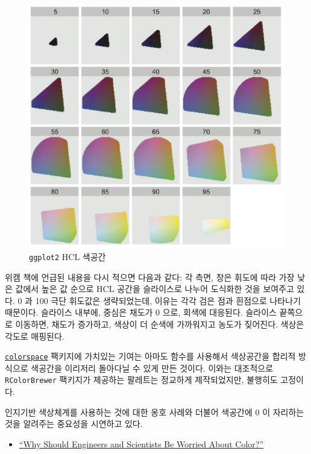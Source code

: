 \documentclass[
  letterpaper,
]{book}
\providecommand{\tightlist}{%
  \setlength{\itemsep}{0pt}\setlength{\parskip}{0pt}}\usepackage{longtable,booktabs,array}
\begin{document}
\begin{figure}

{\centering \includegraphics[width=1\textwidth,height=\textheight]{images/color-viz-ggplot2book-fig6.6.png}

}

\caption{\texttt{ggplot2} HCL 색공간}

\end{figure}

위캠 책에 언급된 내용을 다시 적으면 다음과 같다: 각 측면, 창은 휘도에
따라 가장 낮은 값에서 높은 값 순으로 HCL 공간을 슬라이스로 나누어
도식화한 것을 보여주고 있다. 0 과 100 극단 휘도값은 생략되었는데, 이유는
각각 검은 점과 흰점으로 나타나기 때문이다. 슬라이스 내부에, 중심은
채도가 0 으로, 회색에 대응된다. 슬라이스 끝쪽으로 이동하면, 채도가
증가하고, 색상이 더 순색에 가까워지고 농도가 짖어진다. 색상은 각도로
매핑된다.

\href{https://cran.r-project.org/web/packages/colorspace/}{\texttt{colorspace}}
팩키지에 가치있는 기여는 아마도 함수를 사용해서 색상공간을 합리적
방식으로 색공간을 이리저리 돌아다닐 수 있게 만든 것이다. 이와는
대조적으로 \texttt{RColorBrewer} 팩키지가 제공하는 팔레트는 정교하게
제작되었지만, 불행히도 고정이다.

인지기반 색상체계를 사용하는 것에 대한 옹호 사례와 더불어 색공간에 0 이
자리하는 것을 알려주는 중요성을 시연하고 있다.

\begin{itemize}
\tightlist
\item
  \href{http://www.research.ibm.com/people/l/lloydt/color/color.HTM}{``Why
  Should Engineers and Scientists Be Worried About Color?''}
\end{itemize}
\end{document}
